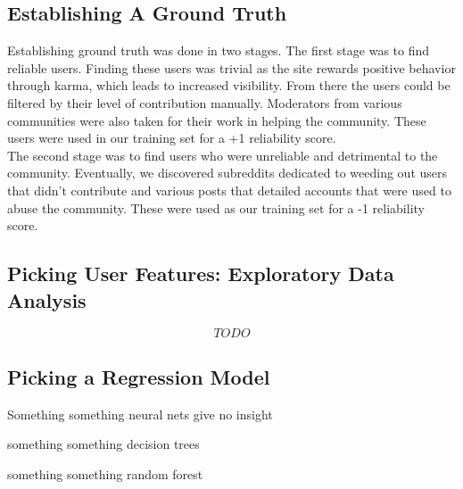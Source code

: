 \subsection{Establishing A Ground Truth} %
\label{sub:establishing_a_ground_truth}
Establishing ground truth was done in two stages. The first stage was to find
reliable users. Finding these users was trivial as the site rewards positive behavior
through karma, which leads to increased visibility. From there the users could
be filtered by their level of contribution manually. Moderators from various
communities were also taken for their work in helping the community. These users
were used in our training set for a +1 reliability score. \\
The second stage was to find users who were unreliable and detrimental to the community.
Eventually, we discovered subreddits dedicated to weeding out users that didn't
contribute and various posts that detailed accounts that were used to abuse the
community. These were used as our training set for a -1 reliability score.


\subsection{Picking User Features: Exploratory Data Analysis} %
\label{sub:picking_user_features}

\[ TODO \]




\subsection{Picking a Regression Model} %
\label{sub:picking_a_regression_model}

Something something neural nets give no insight

something something decision trees

something something random forest

